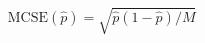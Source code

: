\par\needspace{88pt}\begin{minipage}{\linewidth}
\begin{equation}\mathrm{MCSE}(\hat p)=\sqrt{\hat p(1-\hat p)/M}\label{eq:17}\end{equation}
\end{minipage}\par
